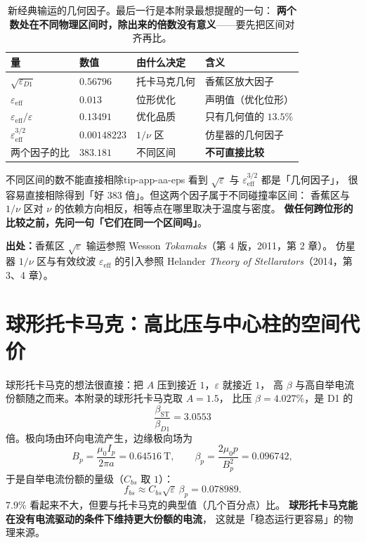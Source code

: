 \begin{table}[htbp]
\centering
\small
\caption{新经典输运的几何因子。最后一行是本附录最想提醒的一句：
\textbf{两个数处在不同物理区间时，除出来的倍数没有意义}——要先把区间对齐再比。}
\label{tab:app-aa-transport}
\begin{tabular}{p{3.4cm}p{3.2cm}p{3.2cm}p{3.3cm}}
\toprule
量 & 数值 & 由什么决定 & 含义 \\
\midrule
$\sqrt{\varepsilon_{D1}}$ & $0.56796$ & 托卡马克几何 & 香蕉区放大因子 \\
$\varepsilon_{\mathrm{eff}}$ & $0.013$ & 位形优化 & 声明值（优化位形） \\
$\varepsilon_{\mathrm{eff}}/\varepsilon$ & $0.13491$ & 优化品质 & 只有几何值的 $13.5\%$ \\
$\varepsilon_{\mathrm{eff}}^{3/2}$ & $0.00148223$ & $1/\nu$ 区 & 仿星器的几何因子 \\
两个因子的比 & $383.181$ & 不同区间 & \textbf{不可直接比较} \\
\bottomrule
\end{tabular}

\end{table}

\begin{tip}{不同区间的数不能直接相除}{tip-app-aa-eps}
看到 $\sqrt{\varepsilon}$ 与 $\varepsilon_{\mathrm{eff}}^{3/2}$ 都是「几何因子」，
很容易直接相除得到「好 $383$ 倍」。但这两个因子属于不同碰撞率区间：
香蕉区与 $1/\nu$ 区对 $\nu$ 的依赖方向相反，相等点在哪里取决于温度与密度。
\textbf{做任何跨位形的比较之前，先问一句「它们在同一个区间吗」}。
\end{tip}

{\footnotesize
\textbf{出处：}香蕉区 $\sqrt{\varepsilon}$ 输运参照 Wesson \emph{Tokamaks}（第 4 版，2011，第 2 章）。
仿星器 $1/\nu$ 区与有效纹波 $\varepsilon_{\mathrm{eff}}$ 的引入参照 Helander
\emph{Theory of Stellarators}（2014，第 3、4 章）。
}

\section{球形托卡马克：高比压与中心柱的空间代价}
\label{sec:app-aa-st}

球形托卡马克的想法很直接：把 $A$ 压到接近 $1$，$\varepsilon$ 就接近 $1$，
高 $\beta$ 与高自举电流份额随之而来。本附录的球形托卡马克取 $A=1.5$，
比压 $\beta = 4.027\%$，是 D1 的
\begin{equation}
\frac{\beta_{\mathrm{ST}}}{\beta_{D1}} = 3.0553
\end{equation}
倍。极向场由环向电流产生，边缘极向场为
\begin{equation}
B_p = \frac{\mu_0 I_p}{2\pi a} = 0.64516\ \mathrm{T},
\qquad
\beta_p = \frac{2\mu_0 p}{B_p^2} = 0.096742,
\label{eq:app-aa-bp}
\end{equation}
于是自举电流份额的量级（$C_{bs}$ 取 $1$）：
\begin{equation}
f_{bs} \approx C_{bs}\sqrt{\varepsilon}\,\beta_p = 0.078989.
\label{eq:app-aa-fbs}
\end{equation}
$7.9\%$ 看起来不大，但要与托卡马克的典型值（几个百分点）比。
\textbf{球形托卡马克能在没有电流驱动的条件下维持更大份额的电流}，
这就是「稳态运行更容易」的物理来源。

